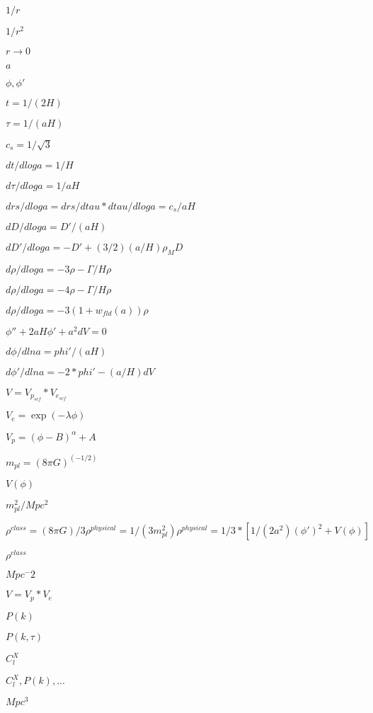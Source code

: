 \documentclass{article}
\begin{document}
$ 1/r $
\pagebreak

$ 1/r^2 $
\pagebreak

$ r\to 0 $
\pagebreak

$ a $
\pagebreak

$ \phi, \phi' $
\pagebreak

$ t=1/(2H) $
\pagebreak

$ \tau=1/(aH) $
\pagebreak

$ c_s=1/\sqrt{3} $
\pagebreak

$ dt/dloga = 1/H $
\pagebreak

$ d\tau/dloga = 1/aH $
\pagebreak

$ drs/dloga = drs/dtau * dtau/dloga = c_s/aH $
\pagebreak

$ dD/dloga = D' / (aH) $
\pagebreak

$ dD'/dloga = -D' + (3/2) (a/H) \rho_M D $
\pagebreak

$ d\rho/dloga = -3 \rho - \Gamma/H \rho $
\pagebreak

$ d\rho/dloga = -4\rho - \Gamma/H \rho $
\pagebreak

$ d\rho/dloga = -3 (1+w_{fld}(a)) \rho $
\pagebreak

$ \phi'' + 2 a H \phi' + a^2 dV = 0 $
\pagebreak

$ d\phi/dlna = phi' / (aH) $
\pagebreak

$ d\phi'/dlna = -2*phi' - (a/H) dV $
\pagebreak

$ V = V_{p_{scf}}*V_{e_{scf}} $
\pagebreak

$ V_e = \exp(-\lambda \phi) $
\pagebreak

$ V_p = (\phi - B)^\alpha + A $
\pagebreak

$ m_{pl} = (8 \pi G)^{(-1/2)}$
\pagebreak

$ V(\phi) $
\pagebreak

$ m_{pl}^2/Mpc^2 $
\pagebreak

$ \rho^{class} = (8 \pi G)/3 \rho^{physical} = 1/(3 m_{pl}^2) \rho^{physical} = 1/3 * [ 1/(2a^2) (\phi')^2 + V(\phi) ] $
\pagebreak

$ \rho^{class} $
\pagebreak

$ Mpc^-2 $
\pagebreak

$ V = V_p*V_e $
\pagebreak

$ P(k)$
\pagebreak

$P(k,\tau)$
\pagebreak

$ C_l^{X} $
\pagebreak

$ C_l^{X}, P(k), ... $
\pagebreak

$ Mpc^3 $
\pagebreak
\end{document}
